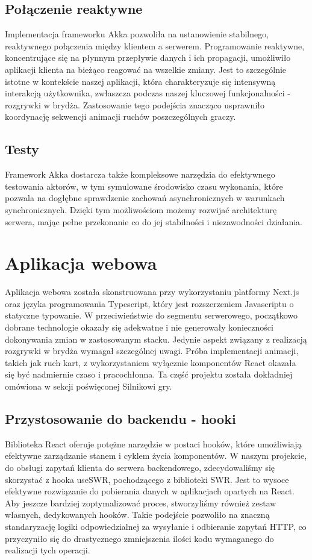 \subsection{Połączenie reaktywne}
Implementacja frameworku Akka pozwoliła na ustanowienie stabilnego, reaktywnego połączenia między klientem a serwerem. Programowanie reaktywne, koncentrujące się na płynnym przepływie danych i ich propagacji, umożliwiło aplikacji klienta na bieżąco reagować na wszelkie zmiany. Jest to szczególnie istotne w kontekście naszej aplikacji, która charakteryzuje się intensywną interakcją użytkownika, zwłaszcza podczas naszej kluczowej funkcjonalności - rozgrywki w brydża. Zastosowanie tego podejścia znacząco usprawniło koordynację sekwencji animacji ruchów poszczególnych graczy.
\subsection{Testy}
Framework Akka dostarcza także kompleksowe narzędzia do efektywnego testowania aktorów, w tym symulowane środowisko czasu wykonania, które pozwala na dogłębne sprawdzenie zachowań asynchronicznych w warunkach synchronicznych. Dzięki tym możliwościom możemy rozwijać architekturę serwera, mając pełne przekonanie co do jej stabilności i niezawodności działania.

\section{Aplikacja webowa}
Aplikacja webowa została skonstruowana przy wykorzystaniu platformy Next.js oraz języka programowania Typescript, który jest rozszerzeniem Javascriptu o statyczne typowanie. W przeciwieństwie do segmentu serwerowego, początkowo dobrane technologie okazały się adekwatne i nie generowały konieczności dokonywania zmian w zastosowanym stacku. Jedynie aspekt związany z realizacją rozgrywki w brydża wymagał szczególnej uwagi. Próba implementacji animacji, takich jak ruch kart, z wykorzystaniem wyłącznie komponentów React okazała się być nadmiernie czaso i pracochłonna. Ta część projektu została dokładniej omówiona w sekcji poświęconej Silnikowi gry.

\subsection{Przystosowanie do backendu - hooki}
Biblioteka React oferuje potężne narzędzie w postaci hooków, które umożliwiają efektywne zarządzanie stanem i cyklem życia komponentów. W naszym projekcie, do obsługi zapytań klienta do serwera backendowego, zdecydowaliśmy się skorzystać z hooka useSWR, pochodzącego z biblioteki SWR. Jest to wysoce efektywne rozwiązanie do pobierania danych w aplikacjach opartych na React. Aby jeszcze bardziej zoptymalizować proces, stworzyliśmy również zestaw własnych, dedykowanych hooków. Takie podejście pozwoliło na znaczną standaryzację logiki odpowiedzialnej za wysyłanie i odbieranie zapytań HTTP, co przyczyniło się do drastycznego zmniejszenia ilości kodu wymaganego do realizacji tych operacji.
